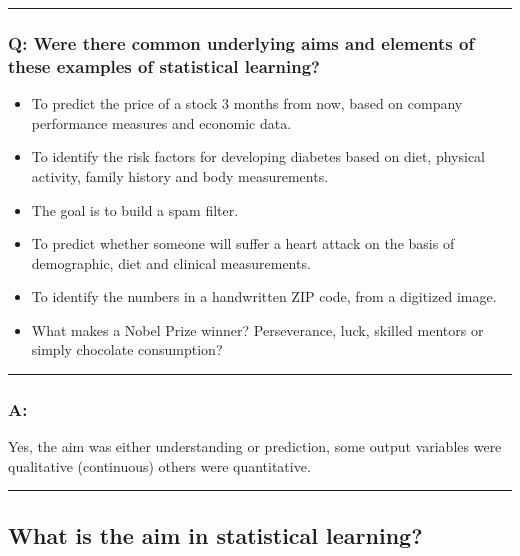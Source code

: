 \documentclass[]{article}
\providecommand{\tightlist}{%
  \setlength{\itemsep}{0pt}\setlength{\parskip}{0pt}}
\begin{document}
\begin{center}\rule{0.5\linewidth}{\linethickness}\end{center}

\hypertarget{q-were-there-common-underlying-aims-and-elements-of-these-examples-of-statistical-learning}{%
\subsubsection{Q: Were there common underlying aims and elements of
these examples of statistical
learning?}\label{q-were-there-common-underlying-aims-and-elements-of-these-examples-of-statistical-learning}}

\begin{itemize}
\tightlist
\item
  To predict the price of a stock 3 months from now, based on company
  performance measures and economic data.
\item
  To identify the risk factors for developing diabetes based on diet,
  physical activity, family history and body measurements.
\item
  The goal is to build a spam filter.
\item
  To predict whether someone will suffer a heart attack on the basis of
  demographic, diet and clinical measurements.
\item
  To identify the numbers in a handwritten ZIP code, from a digitized
  image.
\item
  What makes a Nobel Prize winner? Perseverance, luck, skilled mentors
  or simply chocolate consumption?
\end{itemize}

\begin{center}\rule{0.5\linewidth}{\linethickness}\end{center}

\hypertarget{a}{%
\subsubsection{A:}\label{a}}

Yes, the aim was either understanding or prediction, some output
variables were qualitative (continuous) others were quantitative.

\begin{center}\rule{0.5\linewidth}{\linethickness}\end{center}

\hypertarget{what-is-the-aim-in-statistical-learning}{%
\subsection{What is the aim in statistical
learning?}\label{what-is-the-aim-in-statistical-learning}}
\end{document}
